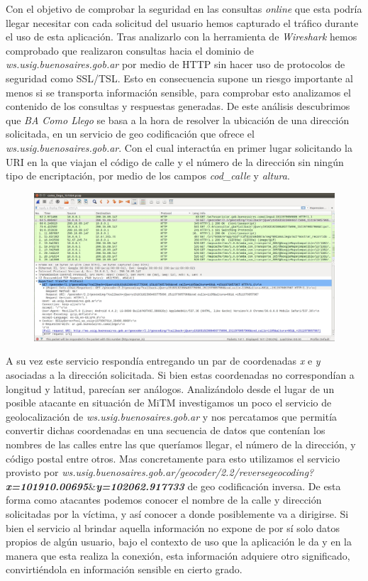 \documentclass[10pt,a4paper]{article}
\begin{document}
Con el objetivo de comprobar la seguridad en las consultas \textit{online} que esta podría llegar necesitar con cada solicitud del usuario hemos capturado el tráfico durante el uso de esta aplicación. Tras analizarlo con la herramienta de \textit{Wireshark} hemos comprobado que realizaron consultas hacia el dominio de \textit{ws.usig.buenosaires.gob.ar} por medio de HTTP sin hacer uso de protocolos de seguridad como SSL/TSL. Esto en consecuencia supone un riesgo importante al menos si se transporta información sensible, para comprobar esto analizamos el contenido de los consultas y respuestas generadas. De este análisis descubrimos que \textit{BA Como Llego} se basa a la hora de resolver la ubicación de una dirección solicitada, en un servicio de geo codificación que ofrece el \textit{ws.usig.buenosaires.gob.ar}. Con el cual interactúa en primer lugar solicitando la URI en la que viajan el código de calle y el número de la dirección sin ningún tipo de encriptación, por medio de los campos \textit{cod\_calle} y \textit{altura}.

\begin{figure}[H]
\centerline{\includegraphics[scale=0.28]{images/como_llego_geocoder.jpg}}
\caption{}
\end{figure}

A su vez este servicio respondía entregando un par de coordenadas \textit{x} e \textit{y} asociadas a la dirección solicitada. Si bien estas coordenadas no correspondían a longitud y latitud, parecían ser análogos. Analizándolo desde el lugar de un posible atacante en situación de MiTM investigamos un poco el servicio de geolocalización de \textit{ws.usig.buenosaires.gob.ar} y nos percatamos que permitía convertir dichas coordenadas en una secuencia de datos que contenían los nombres de las calles entre las que queríamos llegar, el número de la dirección, y código postal entre otros. Mas concretamente para esto utilizamos el servicio provisto por \textit{ws.usig.buenosaires.gob.ar/geocoder/2.2/reversegeocoding?\textbf{x=101910.00695}}\&\textit{\textbf{y=102062.917733}}
 de geo codificación inversa. De esta forma como atacantes podemos conocer el nombre de la calle y dirección solicitadas por la víctima, y así conocer a donde posiblemente va a dirigirse. Si bien el servicio al brindar aquella información no expone de por sí solo datos propios de algún usuario, bajo el contexto de uso que la aplicación le da y en la manera que esta realiza la conexión, esta información adquiere otro significado, convirtiéndola en información sensible en cierto grado.
\end{document}
